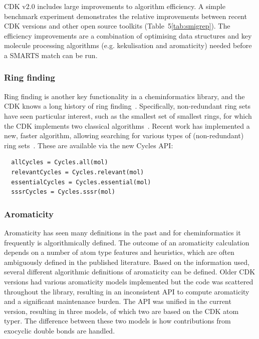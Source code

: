 \documentclass[10pt]{bmcart}
\def \cdkversion {v2.0}
\begin{document}
CDK \cdkversion{} includes large improvements to algorithm
efficiency. A simple benchmark experiment demonstrates the relative
improvements between recent CDK versions and other open source
toolkits (Table~5\ref{tab:smigrep}). The efficiency improvements are a
combination of optimising data structures and key molecule processing
algorithms (e.g. kekulisation and aromaticity) needed before a SMARTS
match can be run.
  


\subsubsection*{Ring finding}

Ring finding is another key functionality in a cheminformatics library, and
the CDK knows a long history of ring finding~\cite{Berger2004,May2014}. Specifically,
non-redundant ring sets have seen particular interest,
such as the smallest set of smallest rings, for which the CDK
implements two classical algorithms~\cite{Figueras1996,Berger2004}.
Recent work has implemented a new, faster algorithm, allowing
searching for various types of (non-redundant) ring
sets~\cite{May2014}. These are available via the new Cycles API:

\vspace{0.2cm}
\begin{verbatim}
  allCycles = Cycles.all(mol)
  relevantCycles = Cycles.relevant(mol)
  essentialCycles = Cycles.essential(mol)
  sssrCycles = Cycles.sssr(mol)
\end{verbatim}
\vspace{0.2cm}

\subsubsection*{Aromaticity}

Aromaticity has seen many definitions in the past and for
cheminformatics it frequently is algorithmically defined. The outcome
of an aromaticity calculation depends on a number of atom type
features and heuristics, which are often ambiguously defined in the
published literature. Based on the information used, several different
algorithmic definitions of aromaticity can be defined. Older CDK
versions had various aromaticity models implemented but the code was scattered
throughout the library, resulting in an inconsistent API
to compute aromaticity and a significant maintenance
burden.  The API was unified in the current version, resulting in three
models, of which two are based on the CDK atom typer. The difference
between these two models is how contributions from exocyclic double
bonds are handled.
\end{document}
